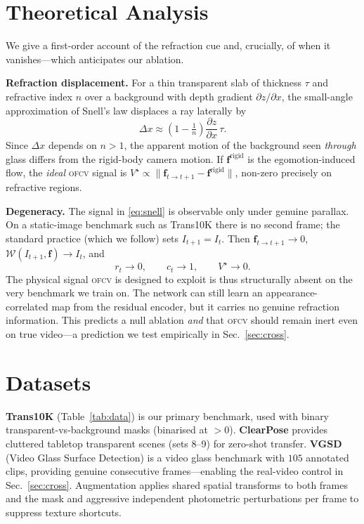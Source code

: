 \documentclass{bmvc2k}
\newcommand{\ofcv}{\textsc{ofcv}}
\begin{document}
\section{Theoretical Analysis}
\label{sec:theory}
We give a first-order account of the refraction cue and, crucially, of when it
vanishes---which anticipates our ablation.

\textbf{Refraction displacement.} For a thin transparent slab of thickness
$\tau$ and refractive index $n$ over a background with depth gradient
$\partial z/\partial x$, the small-angle approximation of Snell's law displaces a
ray laterally by
\begin{equation}
\Delta x \approx \left(1-\tfrac{1}{n}\right)\frac{\partial z}{\partial x}\,\tau .
\label{eq:snell}
\end{equation}
Since $\Delta x$ depends on $n>1$, the apparent motion of the background seen
\emph{through} glass differs from the rigid-body camera motion. If
$\mathbf{f}^{\mathrm{rigid}}$ is the egomotion-induced flow, the \emph{ideal}
\ofcv{} signal is $V^\star\propto\lVert\mathbf{f}_{t\to t+1}-\mathbf{f}^{\mathrm{rigid}}\rVert$,
non-zero precisely on refractive regions.

\textbf{Degeneracy.} The signal in \eqref{eq:snell} is observable only under
genuine parallax. On a static-image benchmark such as Trans10K there is no
second frame; the standard practice (which we follow) sets $I_{t+1}=I_t$. Then
$\mathbf{f}_{t\to t+1}\!\to\!0$, $\mathcal{W}(I_{t+1},\mathbf{f})\!\to\!I_t$, and
\begin{equation}
r_t\to 0,\qquad c_t\to 1,\qquad V^\star\to 0 .
\end{equation}
The physical signal \ofcv{} is designed to exploit is thus structurally absent
on the very benchmark we train on. The network can still learn an
appearance-correlated map from the residual encoder, but it carries no genuine
refraction information. This predicts a null ablation \emph{and} that \ofcv{}
should remain inert even on true video---a prediction we test empirically in
Sec.~\ref{sec:cross}.

\section{Datasets}
\textbf{Trans10K} \cite{xie2020translab} (Table~\ref{tab:data}) is our primary
benchmark, used with binary transparent-vs-background masks (binarised at $>0$).
\textbf{ClearPose} \cite{chen2022clearpose} provides cluttered tabletop
transparent scenes (sets 8--9) for zero-shot transfer. \textbf{VGSD}~\cite{liu2024vgsd}
(Video Glass Surface Detection) is a video glass benchmark with $105$ annotated
clips, providing genuine consecutive frames---enabling the real-video control in
Sec.~\ref{sec:cross}. Augmentation
applies shared spatial transforms to both frames and the mask and aggressive
independent photometric perturbations per frame to suppress texture shortcuts.
\end{document}
